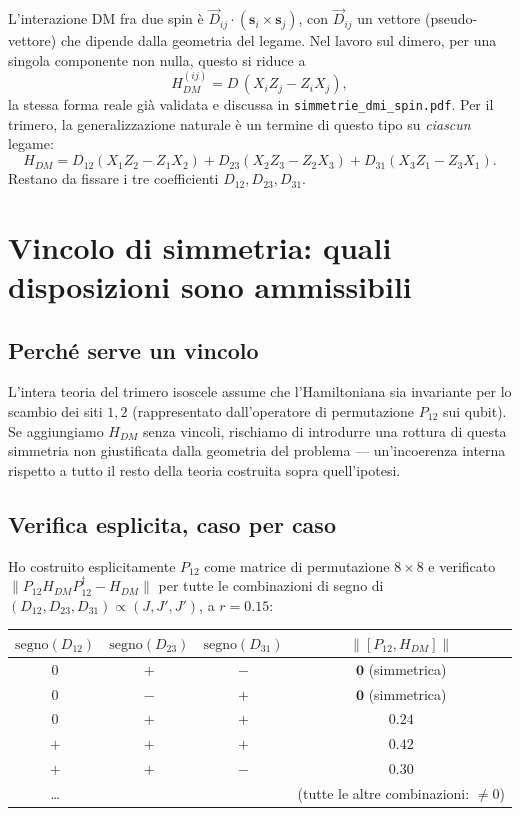\documentclass[11pt,a4paper]{article}
\theoremstyle{remark}
\newcommand{\vs}[1]{\mathbf{s}_{#1}}
\begin{document}
L'interazione DM fra due spin è $\vec D_{ij}\cdot(\vs i\times\vs j)$, con $\vec
D_{ij}$ un vettore (pseudo-vettore) che dipende dalla geometria del legame. Nel lavoro
sul dimero, per una singola componente non nulla, questo si riduce a
\[
H_{DM}^{(ij)} = D\,(X_iZ_j - Z_iX_j),
\]
la stessa forma reale già validata e discussa in \texttt{simmetrie\_dmi\_spin.pdf}. Per
il trimero, la generalizzazione naturale è un termine di questo tipo su \emph{ciascun}
legame:
\[
H_{DM} = D_{12}(X_1Z_2-Z_1X_2) + D_{23}(X_2Z_3-Z_2X_3) + D_{31}(X_3Z_1-Z_3X_1).
\]
Restano da fissare i tre coefficienti $D_{12},D_{23},D_{31}$.

\section{Vincolo di simmetria: quali disposizioni sono ammissibili}

\subsection{Perché serve un vincolo}

L'intera teoria del trimero isoscele assume che l'Hamiltoniana sia invariante per lo
scambio dei siti $1,2$ (rappresentato dall'operatore di permutazione $P_{12}$ sui
qubit). Se aggiungiamo $H_{DM}$ senza vincoli, rischiamo di introdurre una rottura di
questa simmetria non giustificata dalla geometria del problema — un'incoerenza interna
rispetto a tutto il resto della teoria costruita sopra quell'ipotesi.

\subsection{Verifica esplicita, caso per caso}

Ho costruito esplicitamente $P_{12}$ come matrice di permutazione $8\times8$ e
verificato $\|P_{12}H_{DM}P_{12}^\dagger - H_{DM}\|$ per tutte le combinazioni di
segno di $(D_{12},D_{23},D_{31})\propto(J,J',J')$, a $r=0.15$:

\begin{center}
\renewcommand{\arraystretch}{1.25}
\begin{tabular}{cccc}
\toprule
$\mathrm{segno}(D_{12})$ & $\mathrm{segno}(D_{23})$ & $\mathrm{segno}(D_{31})$ & $\|[P_{12},H_{DM}]\|$ \\
\midrule
$0$ & $+$ & $-$ & $\mathbf{0}$ \quad (simmetrica) \\
$0$ & $-$ & $+$ & $\mathbf{0}$ \quad (simmetrica) \\
$0$ & $+$ & $+$ & $0.24$ \\
$+$ & $+$ & $+$ & $0.42$ \\
$+$ & $+$ & $-$ & $0.30$ \\
\ldots & & & (tutte le altre combinazioni: $\neq0$) \\
\bottomrule
\end{tabular}
\end{center}
\end{document}

